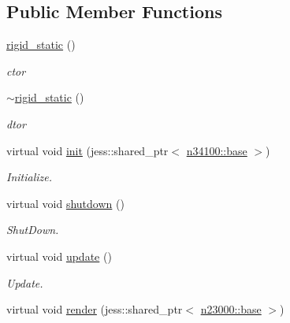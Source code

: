 \subsection*{Public Member Functions}
\begin{DoxyCompactItemize}
\item 
\hyperlink{classnebula_1_1content_1_1actor_1_1renderer_1_1rigid__static_af9913521660485e45402f560abdfcd9c}{rigid\_\-static} ()
\begin{DoxyCompactList}\small\item\em ctor \item\end{DoxyCompactList}\item 
\hyperlink{classnebula_1_1content_1_1actor_1_1renderer_1_1rigid__static_a41e03f82006610a7b19cdd7901999e67}{$\sim$rigid\_\-static} ()
\begin{DoxyCompactList}\small\item\em dtor \item\end{DoxyCompactList}\item 
virtual void \hyperlink{classnebula_1_1content_1_1actor_1_1renderer_1_1rigid__static_a44a1c6a982296b5f1d4c0919c2c4ecf1}{init} (jess::shared\_\-ptr$<$ \hyperlink{classnebula_1_1content_1_1actor_1_1admin_1_1base}{n34100::base} $>$)
\begin{DoxyCompactList}\small\item\em Initialize. \item\end{DoxyCompactList}\item 
virtual void \hyperlink{classnebula_1_1content_1_1actor_1_1renderer_1_1rigid__static_a33ba501805701c5069344a5126830898}{shutdown} ()
\begin{DoxyCompactList}\small\item\em ShutDown. \item\end{DoxyCompactList}\item 
virtual void \hyperlink{classnebula_1_1content_1_1actor_1_1renderer_1_1rigid__static_a3e3b767391a538db88e91035cca7c3dd}{update} ()
\begin{DoxyCompactList}\small\item\em Update. \item\end{DoxyCompactList}\item 
virtual void \hyperlink{classnebula_1_1content_1_1actor_1_1renderer_1_1rigid__static_a37251ebb4a8c07abdff018bc8d1537fb}{render} (jess::shared\_\-ptr$<$ \hyperlink{classnebula_1_1platform_1_1renderer_1_1base}{n23000::base} $>$)

\end{DoxyCompactItemize}
